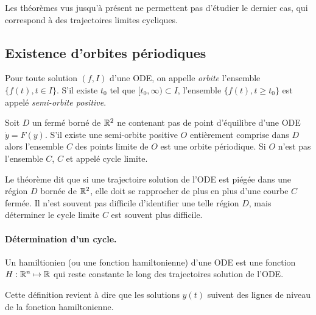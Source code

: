 Les théorèmes vus jusqu'à présent ne permettent pas d'étudier le dernier cas, qui correspond à des trajectoires limites cycliques.

\subsection{Existence d'orbites périodiques} 

\begin{definition}[Orbite]
  Pour toute solution $(f, I)$ d'une ODE, on appelle \emph{orbite} l'ensemble $\{f(t), t \in I\}$. S'il existe $t_0$ tel que $[t_0, \infty) \subset I$, l'ensemble $\{f(t), t \geq t_0\}$ est appelé \emph{semi-orbite positive}.
\end{definition}

\begin{theorem}
  Soit $D$ un fermé borné de $\mathbb{R}^2$ ne contenant pas de point d'équilibre d'une ODE $\dot y = F(y)$. S'il existe une semi-orbite positive $O$ entièrement comprise dans $D$ alors l'ensemble $C$ des points limite de $O$ est une orbite périodique. Si $O$ n'est pas l'ensemble $C$, $C$ et appelé cycle limite.
\end{theorem}

\remark
Le théorème dit que si une trajectoire solution de l'ODE est piégée dans une région $D$ bornée de $\mathbb{R}^2$, elle doit se rapprocher de plus en plus d'une courbe $C$ fermée. Il n'est souvent pas difficile d'identifier une telle région $D$, mais déterminer le cycle limite $C$ est souvent plus difficile.

\paragraph*{Détermination d'un cycle.} 

\begin{definition}[Hamiltionien]
  Un hamiltionien (ou une fonction hamiltonienne) d'une ODE est une fonction $H : \mathbb{R}^n \mapsto \mathbb{R}$ qui reste constante le long des trajectoires solution de l'ODE.
\end{definition}

\remark
Cette définition revient à dire que les solutions $y(t)$ suivent des lignes de niveau de la fonction hamiltonienne.

